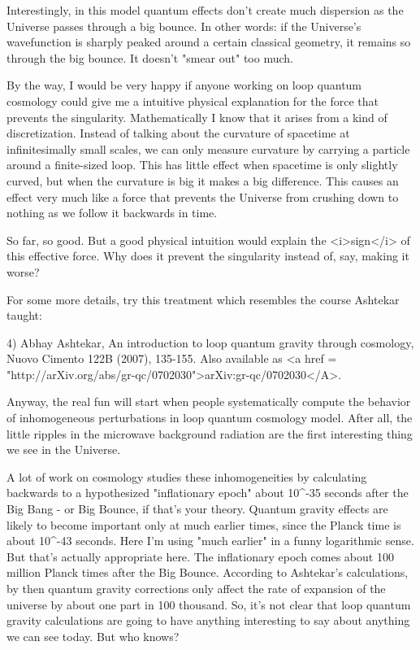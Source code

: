 Interestingly, in this model quantum effects don't create much
dispersion as the Universe passes through a big bounce.  In other
words: if the Universe's wavefunction is sharply peaked around a
certain classical geometry, it remains so through the big bounce.  It
doesn't "smear out" too much.

By the way, I would be very happy if anyone working on loop quantum
cosmology could give me a intuitive physical explanation for the force
that prevents the singularity.  Mathematically I know that it arises
from a kind of discretization.  Instead of talking about the curvature
of spacetime at infinitesimally small scales, we can only measure
curvature by carrying a particle around a finite-sized loop.  This has
little effect when spacetime is only slightly curved, but when the
curvature is big it makes a big difference.  This causes an effect
very much like a force that prevents the Universe from crushing down
to nothing as we follow it backwards in time.

So far, so good.  But a good physical intuition would explain the
<i>sign</i> of this effective force.  Why does it prevent the
singularity instead of, say, making it worse?

For some more details, try this treatment which resembles the course
Ashtekar taught:

4) Abhay Ashtekar, An introduction to loop quantum gravity through
cosmology, Nuovo Cimento 122B (2007), 135-155.  Also available as
<a href = "http://arXiv.org/abs/gr-qc/0702030">arXiv:gr-qc/0702030</A>.

Anyway, the real fun will start when people systematically compute the
behavior of inhomogeneous perturbations in loop quantum cosmology
model.  After all, the little ripples in the microwave background
radiation are the first interesting thing we see in the Universe.

A lot of work on cosmology studies these inhomogeneities by
calculating backwards to a hypothesized "inflationary epoch"
about 10^{-35} seconds after the Big Bang - or Big Bounce, if
that's your theory.  Quantum gravity effects are likely to become
important only at much earlier times, since the Planck time is about
10^{-43} seconds.  Here I'm using "much earlier" in
a funny logarithmic sense.  But that's actually appropriate here.  The
inflationary epoch comes about 100 million Planck times after the Big
Bounce.  According to Ashtekar's calculations, by then quantum gravity
corrections only affect the rate of expansion of the universe by about
one part in 100 thousand.  So, it's not clear that loop quantum
gravity calculations are going to have anything interesting to say
about anything we can see today.  But who knows?

